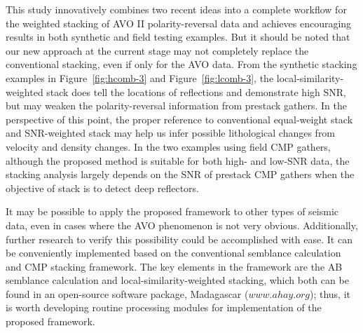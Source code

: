 This study innovatively combines two recent ideas into a complete workflow for the weighted stacking of AVO II polarity-reversal data and achieves encouraging results in both synthetic and field testing examples. But it should be noted that our new approach at the current stage may not completely replace the conventional stacking, even if only for the AVO data. From the synthetic stacking examples in Figure~\ref{fig:hcomb-3} and Figure~\ref{fig:lcomb-3}, the local-similarity-weighted stack does tell the locations of reflections and demonstrate high SNR, but may weaken the polarity-reversal information from prestack gathers. In the perspective of this point, the proper reference to conventional equal-weight stack and SNR-weighted stack may help us infer possible lithological changes from velocity and density changes. In the two examples using field CMP gathers, although the proposed method is suitable for both high- and low-SNR data, the stacking analysis largely depends on the SNR of prestack CMP gathers when the objective of stack is to detect deep reflectors. 

It may be possible to apply the proposed framework to other types of seismic data, even in cases where the AVO phenomenon is not very obvious. Additionally, further research to verify this possibility could be accomplished with ease. It can be conveniently implemented based on the conventional semblance calculation and CMP stacking framework. The key elements in the framework are the AB semblance calculation and local-similarity-weighted stacking, which both can be found in an open-source software package, Madagascar ($www.ahay.org$); thus, it is worth developing routine processing modules for implementation of the proposed framework.

